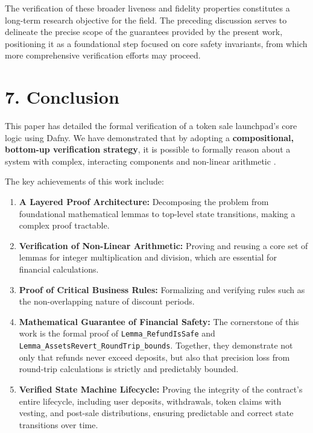 \documentclass[
  english,
  onecolumn]{article}
\providecommand{\tightlist}{%
  \setlength{\itemsep}{0pt}\setlength{\parskip}{0pt}}
\begin{document}
The verification of these broader liveness and fidelity properties
constitutes a long-term research objective for the field. The preceding
discussion serves to delineate the precise scope of the guarantees
provided by the present work, positioning it as a foundational step
focused on core safety invariants, from which more comprehensive
verification efforts may proceed.

\section{7. Conclusion}\label{conclusion}

This paper has detailed the formal verification of a token sale
launchpad's core logic using Dafny. We have demonstrated that by
adopting a \textbf{compositional, bottom-up verification strategy}, it
is possible to formally reason about a system with complex, interacting
components and non-linear arithmetic \citep{chen2021compositional}.

The key achievements of this work include:

\begin{enumerate}
\def\labelenumi{\arabic{enumi}.}
\tightlist
\item
  \textbf{A Layered Proof Architecture:} Decomposing the problem from
  foundational mathematical lemmas to top-level state transitions,
  making a complex proof tractable.
\item
  \textbf{Verification of Non-Linear Arithmetic:} Proving and reusing a
  core set of lemmas for integer multiplication and division, which are
  essential for financial calculations.
\item
  \textbf{Proof of Critical Business Rules:} Formalizing and verifying
  rules such as the non-overlapping nature of discount periods.
\item
  \textbf{Mathematical Guarantee of Financial Safety:} The cornerstone
  of this work is the formal proof of \texttt{Lemma\_RefundIsSafe} and
  \texttt{Lemma\_AssetsRevert\_RoundTrip\_bounds}. Together, they
  demonstrate not only that refunds never exceed deposits, but also that
  precision loss from round-trip calculations is strictly and
  predictably bounded.
\item
  \textbf{Verified State Machine Lifecycle:} Proving the integrity of
  the contract's entire lifecycle, including user deposits, withdrawals,
  token claims with vesting, and post-sale distributions, ensuring
  predictable and correct state transitions over time.
\end{enumerate}
\end{document}
